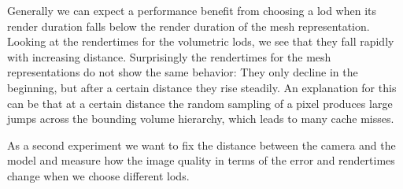 Generally we can expect a performance benefit from choosing a \ac{lod} when its render duration falls below the render duration of the mesh representation.
Looking at the rendertimes for the volumetric \acsp{lod}, we see that they fall rapidly with increasing distance.
Surprisingly the rendertimes for the mesh representations do not show the same behavior: They only decline in the beginning, but after a certain distance they rise steadily.
An explanation for this can be that at a certain distance the random sampling of a pixel produces large jumps across the bounding volume hierarchy, which leads to many cache misses.

As a second experiment we want to fix the distance between the camera and the model and measure how the image quality in terms of the \FLIP error and rendertimes change when we choose different \acsp{lod}.
